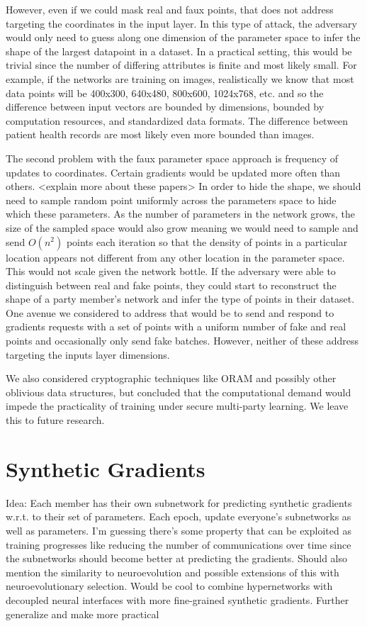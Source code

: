 However, even if we could mask real and faux points, that does not address targeting the coordinates in the input layer. In this type of attack, the adversary would only need to guess along one dimension of the parameter space to infer the shape of the largest datapoint in a dataset. In a practical setting, this would be trivial since the number of differing attributes is finite and most likely small. For example, if the networks are training on images, realistically we know that most data points will be 400x300, 640x480, 800x600, 1024x768, etc. and so the difference between input vectors are bounded by dimensions, bounded by computation resources, and standardized data formats. The difference between patient health records are most likely even more bounded than images. 

The second problem with the faux parameter space approach is frequency of updates to coordinates. Certain gradients would be updated more often than others. <explain more about these papers> In order to hide the shape, we should need to sample random point uniformly across the parameters space to hide which these parameters. As the number of parameters in the network grows, the size of the sampled space would also grow meaning we would need to sample and send $O(n^2)$ points each iteration so that the density of points in a particular location appears not different from any other location in the parameter space. This would not scale given the network bottle. If the adversary were able to distinguish between real and fake points, they could start to reconstruct the shape of a party member’s network and infer the type of points in their dataset. One avenue we considered to address that would be to send and respond to gradients requests with a set of points with a uniform number of fake and real points and occasionally only send fake batches. However, neither of these address targeting the inputs layer dimensions.

We also considered cryptographic techniques like ORAM and possibly other oblivious data structures, but concluded that the computational demand would impede the practicality of training under secure multi-party learning. We leave this to future research.

\section{Synthetic Gradients}
Idea: Each member has their own subnetwork for predicting synthetic gradients w.r.t. to their set of parameters. Each epoch, update everyone’s subnetworks as well as parameters. I’m guessing there’s some property that can be exploited as training progresses like reducing the number of communications over time since the subnetworks should become better at predicting the gradients. Should also mention the similarity to neuroevolution and possible extensions of this with neuroevolutionary selection. Would be cool to combine hypernetworks with decoupled neural interfaces with more fine-grained synthetic gradients.
Further generalize and make more practical

